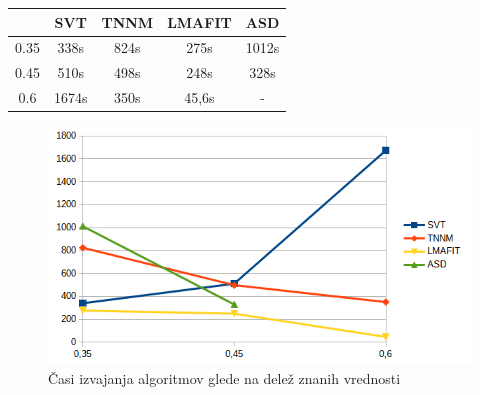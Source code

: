 \begin{table}[h]
    \centering
    \begin{tabular}{|c|c|c|c|c|}
    \hline
    & SVT & TNNM & LMAFIT & ASD \\ \hline
    0.35 & 338s & 824s & 275s & 1012s \\ \hline
    0.45 & 510s & 498s & 248s & 328s\\ \hline
    0.6 & 1674s & 350s & 45,6s & - \\ \hline
    \end{tabular}
\end{table}
\begin{figure}[!ht]
    \centering
    \includegraphics[width=\linewidth]{Poglavja/Slike/grayscale1000/grafCas.png}
    \caption{Časi izvajanja algoritmov glede na delež znanih vrednosti}
\end{figure}

